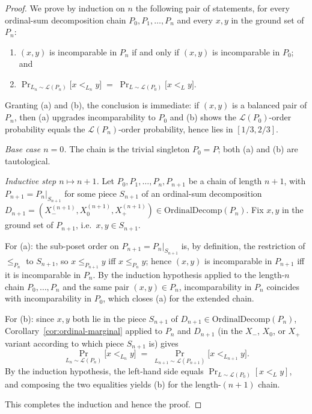\begin{proof}
We prove by induction on $n$ the following pair of statements, for
every ordinal-sum decomposition chain $P_0, P_1, \ldots, P_n$ and
every $x, y$ in the ground set of $P_n$:
\begin{enumerate}[label=\textnormal{(\alph*)},nosep]
  \item $(x, y)$ is incomparable in $P_n$ if and only if $(x, y)$ is
        incomparable in $P_0$; and
  \item $\Pr_{L_n \sim \mathcal L(P_n)}\!\big[x <_{L_n} y\big]
        \;=\;
        \Pr_{L \sim \mathcal L(P_0)}\!\big[x <_L y\big]$.
\end{enumerate}
Granting (a) and (b), the conclusion is immediate: if $(x, y)$ is a
balanced pair of $P_n$, then (a) upgrades incomparability to $P_0$
and (b) shows the $\mathcal L(P_0)$-order probability equals the
$\mathcal L(P_n)$-order probability, hence lies in $[1/3, 2/3]$.

\emph{Base case $n = 0$.} The chain is the trivial singleton
$P_0 = P$; both (a) and (b) are tautological.

\emph{Inductive step $n \mapsto n+1$.} Let
$P_0, P_1, \ldots, P_n, P_{n+1}$ be a chain of length $n+1$, with
$P_{n+1} = P_n|_{S_{n+1}}$ for some piece $S_{n+1}$ of an ordinal-sum
decomposition $D_{n+1}=(X_-^{(n+1)},X_0^{(n+1)},X_+^{(n+1)}) \in
\mathrm{OrdinalDecomp}(P_n)$. Fix $x, y$ in the ground set of
$P_{n+1}$, i.e.\ $x, y \in S_{n+1}$.

For (a): the sub-poset order on $P_{n+1} = P_n|_{S_{n+1}}$ is, by
definition, the restriction of $\le_{P_n}$ to $S_{n+1}$, so
$x \le_{P_{n+1}} y$ iff $x \le_{P_n} y$; hence $(x, y)$ is
incomparable in $P_{n+1}$ iff it is incomparable in $P_n$. By the
induction hypothesis applied to the length-$n$ chain
$P_0, \ldots, P_n$ and the same pair $(x, y) \in P_n$,
incomparability in $P_n$ coincides with incomparability in $P_0$,
which closes (a) for the extended chain.

For (b): since $x, y$ both lie in the piece $S_{n+1}$ of
$D_{n+1} \in \mathrm{OrdinalDecomp}(P_n)$,
Corollary~\ref{cor:ordinal-marginal} applied to $P_n$ and $D_{n+1}$
(in the $X_-$, $X_0$, or $X_+$ variant according to which piece
$S_{n+1}$ is) gives
\[
  \Pr_{L_n \sim \mathcal L(P_n)}\!\big[x <_{L_n} y\big]
  \;=\;
  \Pr_{L_{n+1} \sim \mathcal L(P_{n+1})}\!\big[x <_{L_{n+1}} y\big].
\]
By the induction hypothesis, the left-hand side equals
$\Pr_{L \sim \mathcal L(P_0)}[x <_L y]$, and composing the two
equalities yields (b) for the length-$(n+1)$ chain.

This completes the induction and hence the proof.
\end{proof}

